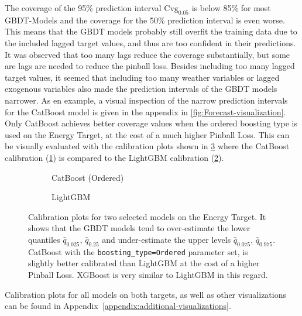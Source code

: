 The coverage of the 95\% prediction interval $\text{Cvg}_{0.05}$ is below 85\% for most GBDT-Models and the coverage for the 50\% prediction interval is even worse. This means that the GBDT models probably still overfit the training data due to the included lagged target values, and thus are too confident in their predictions. It was observed that too many lags reduce the coverage substantially, but some are lags are needed to reduce the pinball loss. Besides including too many lagged target values, it seemed that including too many weather variables or lagged exogenous variables also made the prediction intervals of the GBDT models narrower. As en example, a visual inspection of the narrow prediction intervals for the CatBoost model is given in the appendix in \cref{fig:Forecast-visualization}.
Only CatBoost achieves better coverage values when the ordered boosting type is used on the Energy
Target, at the cost of a much higher Pinball Loss. This can be visually evaluated with the calibration plots shown in \cref{fig:calibration-comparison} where the CatBoost calibration (\cref{fig:catboost-ordered-calibration}) is compared to the LightGBM calibration (\cref{fig:lgbm-calibration}).
\begin{figure}[htbp]
    \centering
    \begin{subfigure}[b]{0.5\textwidth}
        \centering
        
        \caption{CatBoost (Ordered)}
        \label{fig:catboost-ordered-calibration}
    \end{subfigure}%
    \begin{subfigure}[b]{0.5\textwidth}
        \centering
        
        \caption{LightGBM}
        \label{fig:lgbm-calibration}
    \end{subfigure}
    \caption{Calibration plots for two selected models on the Energy Target. It shows that the GBDT models tend to over-estimate the lower quantiles $\hat{q}_{0.025}$, $\hat{q}_{0.25}$ and under-estimate the upper levels $\hat{q}_{0.075}$, $\hat{q}_{0.975}$. CatBoost with the \texttt{boosting\_type=Ordered} parameter set, is slightly better calibrated than LightGBM at the cost of a higher Pinball Loss. XGBoost is very similar to LightGBM in this regard.}
    \label{fig:calibration-comparison}
\end{figure}

Calibration plots for all models on both targets, as well as other visualizations can be found in Appendix~\ref{appendix:additional-visualizations}.


